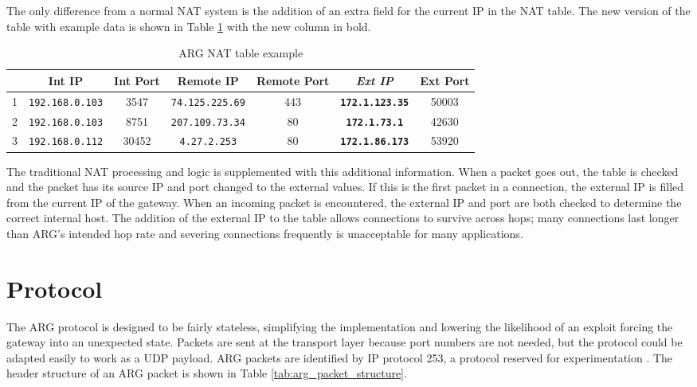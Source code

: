\par The only difference from a normal \ac{NAT} system is the addition of an extra field for the current \ac{IP} in the \ac{NAT} table. The new version of the table with example data is shown in Table \ref{tab:arg_nat_example} with the new column in bold.

\begin{table}
\caption{\ac{ARG} \ac{NAT} table example}
\label{tab:arg_nat_example}
\centering
\begin{tabular}{r|cccccc}
  & \textbf{Int IP}  & \textbf{Int Port}  & \textbf{Remote IP}  & \textbf{Remote Port}  & \textbf{\textit{Ext IP}}  & \textbf{Ext Port} \\
\hline
1 & \texttt{192.168.0.103} & 3547 & \texttt{74.125.225.69} & 443 & \textbf{\texttt{172.1.123.35}} & 50003\\
2 & \texttt{192.168.0.103} & 8751 & \texttt{207.109.73.34} & 80 & \textbf{\texttt{172.1.73.1}} & 42630\\
3 & \texttt{192.168.0.112} & 30452 & \texttt{4.27.2.253} & 80 & \textbf{\texttt{172.1.86.173}} & 53920
\end{tabular}
\end{table}

\par The traditional \ac{NAT} processing and logic is supplemented with this additional information. When a packet goes out, the table is checked and the packet has its source IP and port changed to the external values. If this is the first packet in a connection, the external IP is filled from the current IP of the gateway. When an incoming packet is encountered, the external IP and port are both checked to determine the correct internal host. The addition of the external IP to the table allows connections to survive across hops; many connections last longer than \ac{ARG}'s intended hop rate and severing connections frequently is unacceptable for many applications. 

\section{Protocol}
\label{sec:arg_protocol}
\par The \ac{ARG} protocol is designed to be fairly stateless, simplifying the implementation and lowering the likelihood of an exploit forcing the gateway into an unexpected state. Packets are sent at the transport layer because port numbers are not needed, but the protocol could be adapted easily to work as a \ac{UDP} payload. \ac{ARG} packets are identified by \ac{IP} protocol 253, a protocol reserved for experimentation \cite{rfc3692}. The header structure of an \ac{ARG} packet is shown in Table \ref{tab:arg_packet_structure}.

